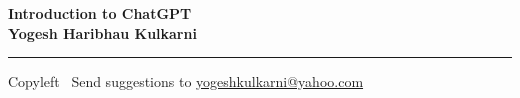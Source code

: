 
\graphicspath{{images/}}

\footnotesize


\begin{center}
\Large{\textbf{Introduction to ChatGPT\\ Yogesh Haribhau Kulkarni}}  
\end{center}

\begin{multicols}{2}

\end{multicols}

\rule{\linewidth}{0.25pt}
\scriptsize
Copyleft \textcopyleft\  Send suggestions to 
\href{http://www.yogeshkulkarni.com}{yogeshkulkarni@yahoo.com}


